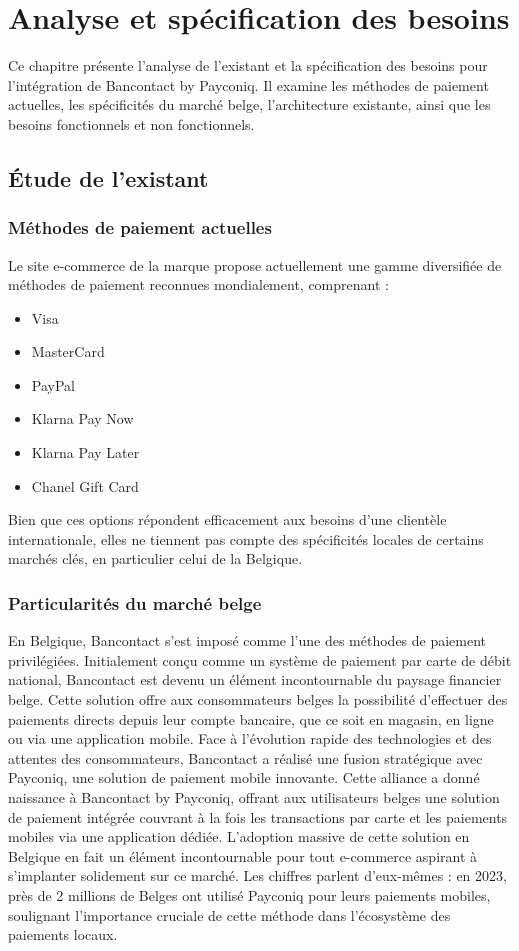 
\chapter{Analyse et spécification des besoins}
\label{chap:Analyse et spécification des besoins}

Ce chapitre présente l'analyse de l'existant et la spécification des besoins pour l'intégration de Bancontact by Payconiq. Il examine les méthodes de paiement actuelles, les spécificités du marché belge, l'architecture existante, ainsi que les besoins fonctionnels et non fonctionnels.
\pagebreak

\section{Étude de l’existant}
\subsection{Méthodes de paiement actuelles}
Le site e-commerce de la marque propose actuellement une gamme diversifiée de méthodes de paiement reconnues mondialement, comprenant :
\begin{itemize}
    \item Visa
    \item MasterCard
    \item PayPal
    \item Klarna Pay Now
    \item Klarna Pay Later
    \item Chanel Gift Card
\end{itemize}
Bien que ces options répondent efficacement aux besoins d'une clientèle internationale, elles ne tiennent pas compte des spécificités locales de certains marchés clés, en particulier celui de la Belgique.
\subsection{Particularités du marché belge}
En Belgique, Bancontact s'est imposé comme l'une des méthodes de paiement privilégiées. Initialement conçu comme un système de paiement par carte de débit national, Bancontact est devenu un élément incontournable du paysage financier belge. Cette solution offre aux consommateurs belges la possibilité d'effectuer des paiements directs depuis leur compte bancaire, que ce soit en magasin, en ligne ou via une application mobile.
Face à l'évolution rapide des technologies et des attentes des consommateurs, Bancontact a réalisé une fusion stratégique avec Payconiq, une solution de paiement mobile innovante. Cette alliance a donné naissance à Bancontact by Payconiq, offrant aux utilisateurs belges une solution de paiement intégrée couvrant à la fois les transactions par carte et les paiements mobiles via une application dédiée.
L'adoption massive de cette solution en Belgique en fait un élément incontournable pour tout e-commerce aspirant à s'implanter solidement sur ce marché. Les chiffres parlent d'eux-mêmes : en 2023, près de 2 millions de Belges ont utilisé Payconiq pour leurs paiements mobiles, soulignant l'importance cruciale de cette méthode dans l'écosystème des paiements locaux.
